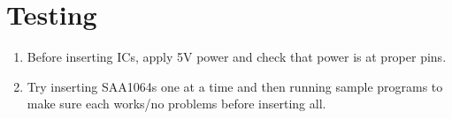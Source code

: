 \documentclass[11pt]{article}
\begin{document}
\section{Testing}
\begin{enumerate}
\item Before inserting ICs, apply 5V power and check that power is
      at proper pins.
\item Try inserting SAA1064s one at a time and then running sample
      programs to make sure each works/no problems before inserting all.
\end{enumerate}


\end{document}
